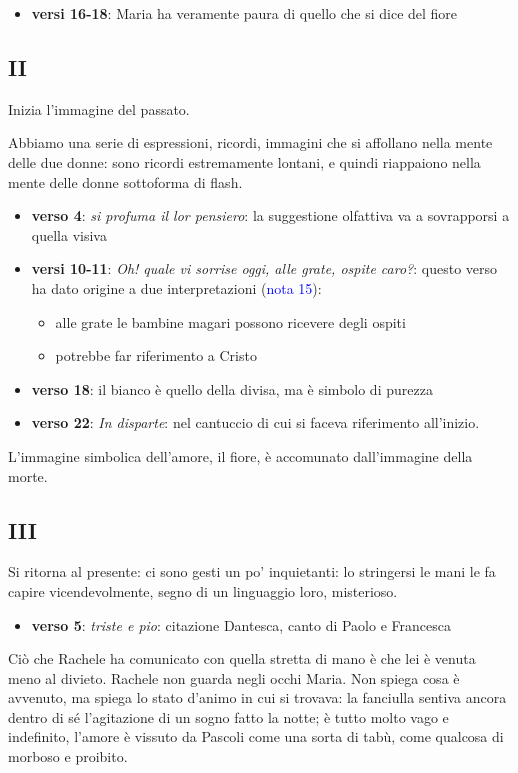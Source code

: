\documentclass[a4paper, twoside, titlepage]{book}
\newcommand{\elenco}[1]{%
\begin{itemize}
#1
\end{itemize}}
\renewcommand{\emph}[1]{\textcolor{blue}{#1}}
\begin{document}
\elenco{\item \textbf{versi 16-18}: Maria ha veramente paura di quello che si dice del fiore
}

\subsection*{II}

Inizia l'immagine del passato.

Abbiamo una serie di espressioni, ricordi, immagini che si affollano nella mente delle due donne: sono ricordi estremamente lontani, e quindi riappaiono nella mente delle donne sottoforma di flash.

\elenco{\item \textbf{verso 4}: \textit{si profuma il lor pensiero}: la suggestione olfattiva va a sovrapporsi a quella visiva
\item \textbf{versi 10-11}: \textit{Oh! quale vi sorrise oggi, alle grate, ospite caro?}: questo verso ha dato origine a due interpretazioni (\emph{nota 15}):
  \elenco{\item alle grate le bambine magari possono ricevere degli ospiti
  \item potrebbe far riferimento a Cristo}
\item \textbf{verso 18}: il bianco è quello della divisa, ma è simbolo di purezza
\item \textbf{verso 22}: \textit{In disparte}: nel cantuccio di cui si faceva riferimento all'inizio.}

L'immagine simbolica dell'amore, il fiore, è accomunato dall'immagine della morte.

\subsection*{III}

Si ritorna al presente: ci sono gesti un po' inquietanti: lo stringersi le mani le fa capire vicendevolmente, segno di un linguaggio loro, misterioso.

\elenco{\item \textbf{verso 5}: \textit{triste e pio}: citazione Dantesca, canto di Paolo e Francesca}

Ciò che Rachele ha comunicato con quella stretta di mano è che lei è venuta meno al divieto. Rachele non guarda negli occhi Maria.
Non spiega cosa è avvenuto, ma spiega lo stato d'animo in cui si trovava: la fanciulla sentiva ancora dentro di sé l'agitazione di un sogno fatto la notte; è tutto molto vago e indefinito, l'amore è vissuto da Pascoli come una sorta di tabù, come qualcosa di morboso e proibito.
\end{document}

